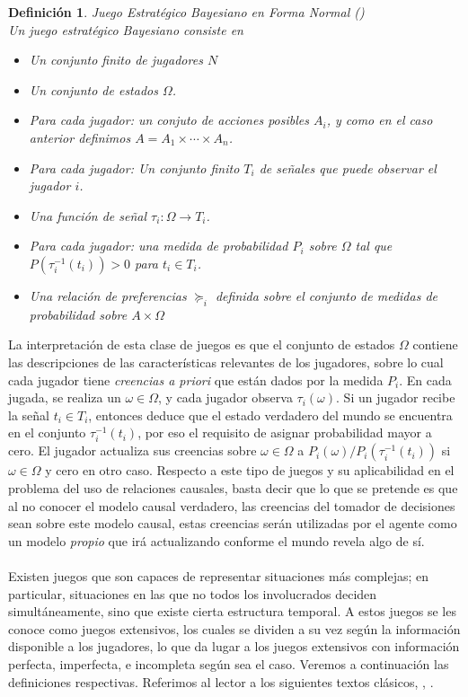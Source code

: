 \documentclass[11pt]{article}
\theoremstyle{plain}
\newtheorem{defi}[teo]{Definición}
\begin{document}
\begin{defi}{\label{juegobayesiano}}Juego Estratégico Bayesiano en Forma Normal (\cite{osborne1994course})\\
Un juego estratégico Bayesiano consiste en
\begin{itemize}
\item Un conjunto finito de jugadores $N$
\item Un conjunto de \textit{estados} $\Omega$.
\item Para cada jugador: un conjuto de acciones posibles $A_i$, y como en el caso anterior definimos $A = A_1 \times \cdots \times A_n$.
\item Para cada jugador: Un conjunto finito $T_i$ de señales que puede observar el jugador $i$.
\item Una función de señal $\tau_i : \Omega \to T_i$.
\item Para cada jugador: una medida de probabilidad $P_i$ sobre $\Omega$ tal que $P( \tau^{-1}_i (t_i)) >0$ para $t_i \in T_i$.
\item Una relación de preferencias $\succeq_i$ definida sobre el conjunto de medidas de probabilidad sobre $A \times \Omega$
\end{itemize}
\end{defi}
La interpretación de esta clase de juegos es que el conjunto de estados $\Omega$ contiene las descripciones de las características relevantes de los jugadores, sobre lo cual cada jugador tiene \textit{creencias a priori} que están dados por la medida $P_i$. En cada jugada, se realiza un $\omega \in \Omega$, y cada jugador observa $\tau_i (\omega)$. Si un jugador recibe la señal $t_i \in T_i$, entonces deduce que el estado verdadero del mundo se encuentra en el conjunto $\tau^{-1}_i (t_i)$, por eso el requisito de asignar probabilidad mayor a cero. El jugador actualiza sus creencias sobre $\omega \in \Omega$ a $P_i(\omega) / P_i(\tau^{-1}_i (t_i))$ si $\omega \in \Omega$ y cero en otro caso. Respecto a este tipo de juegos y su aplicabilidad en el problema del uso de relaciones causales, basta decir que lo que se pretende es que al no conocer el modelo causal verdadero, las creencias del tomador de decisiones sean sobre este modelo causal, estas creencias serán utilizadas por el agente como un modelo \textit{propio} que irá actualizando conforme el mundo revela algo de sí.\\
\\
\indent Existen juegos que son capaces de representar situaciones más complejas; en particular, situaciones en las que no todos los involucrados deciden simultáneamente, sino que existe cierta estructura temporal. A estos juegos se les conoce como juegos extensivos, los cuales se dividen a su vez según la información disponible a los jugadores, lo que da lugar a los juegos extensivos con información perfecta, imperfecta, e incompleta según sea el caso. Veremos a continuación las definiciones respectivas. Referimos al lector a los siguientes textos clásicos\cite{osborne1994course}, \cite{shoham2008multiagent}, \cite{10.1007/978-94-010-0189-2_25}.
\end{document}
